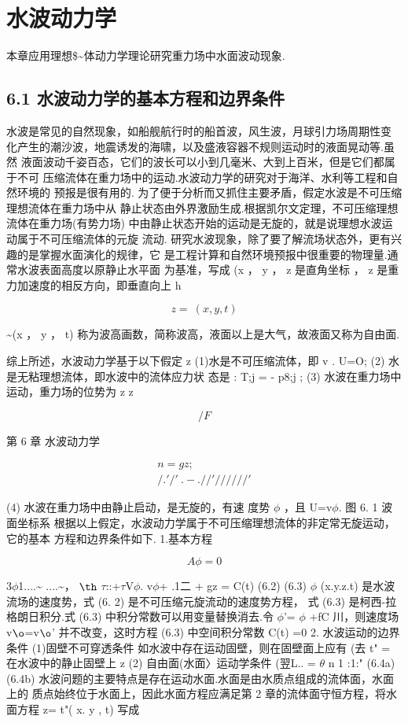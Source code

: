 \chapter{水波动力学}
本章应用理想\$\textasciitilde{}体动力学理论研究重力场中水面波动现象.

\section*{6.1  水波动力学的基本方程和边界条件}

水波是常见的自然现象，如船舰航行时的船首波，风生波，月球引力场周期性变 化产生的潮沙波，地震诱发的海啸，以及盛液容器不规则运动时的液面晃动等.虽然 液面波动千姿百态，它们的波长可以小到几毫米、大到上百米，但是它们都属于不可 压缩流体在重力场中的运动.水波动力学的研究对于海洋、水利等工程和自然环境的 预报是很有用的. 为了便于分析而又抓住主要矛盾，假定水波是不可压缩理想流体在重力场中从 静止状态由外界激励生成.根据凯尔文定理，不可压缩理想流体在重力场(有势力场) 中由静止状态开始的运动是无旋的，就是说理想水波运动属于不可压缩流体的元旋 流动. 研究水波现象，除了要了解流场状态外，更有兴趣的是掌握水面演化的规律，它 是工程计算和自然环境预报中很重要的物理量.通常水波表面高度以原静止水平面 为基准，写成 (x ， y ， z 是直角坐标 ， z 是重力加速度的相反方向，即垂直向上 h

\begin{equation*}z = ~(x ,  y ,  t)\tag{6.1}\end{equation*}

\textasciitilde{}(x ， y ， t) 称为波高画数，简称波高，液面以上是大气，故液面又称为自由面.

综上所述，水波动力学基于以下假定 z (1)水是不可压缩流体，即 v . U=O; (2) 水是无粘理想流体，即水波中的流体应力状 态是 : T;j = - p8;j ; (3) 水波在重力场中运动，重力场的位势为 z z

\[/F\]

第 6 章 水波动力学

\begin{gather*}
n=gz;\\
/ .' /' ~.- ./ /' / / / / / /'
\end{gather*}

(4) 水波在重力场中由静止启动，是无旋的，有速 度势 $\phi$ ，且 U=v$\phi$. 图 6. 1 波面坐标系 根据以上假定，水波动力学属于不可压缩理想流体的非定常无旋运动，它的基本 方程和边界条件如下. 1.基本方程

\[A\phi =0\]

3$\phi$1....\textasciitilde{} ....\textasciitilde{}， ${\rm þ}$ $\tau$::+$\tau$V$\phi$. v$\phi$+ .1二 + gz = C(t) (6.2) (6.3) $\phi$ (x.y.z.t) 是水波流场的速度势，式 (6. 2) 是不可压缩元旋流动的速度势方程， 式 (6.3) 是柯西-拉格朗日积分.式 (6.3) 中积分常数可以用变量替换消去.令 $\phi$'= $\phi$ +fC 川，则速度场 v${\rm ø}$=v${\rm ø}$' 并不改变，这时方程 (6.3) 中空间积分常数 C(t) =0 2. 水波运动的边界条件 (1)固壁不可穿透条件 如水波中存在运动固壁，则在固壁面上应有 (去 t" = 在水波中的静止固壁上 z (2) 自由面(水面〉运动学条件 (翌L.. = $\theta$ n 1 :1:" (6.4a) (6.4b) 水波问题的主要特点是存在运动水面.水面是由水质点组成的流体面，水面上的 质点始终位于水面上，因此水面方程应满足第 2 章的流体面守恒方程，将水面方程 z= t"( x. y , t) 写成

